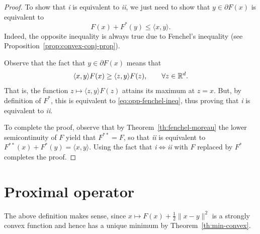 \documentclass{report}
\begin{document}
\begin{proof}
	To show that \emph{i} is equivalent to \emph{ii}, we just need to show that $y\in \partial F(x)$ is equivalent to 
	\begin{equation}
		\label{eq:opp-fenchel-ineq}
		F(x)+F^*(y) \le \langle  x,y\rangle.
	\end{equation}
	Indeed, the opposite inequality is always true due to Fenchel's inequality (see Proposition~\ref{prop:convex-conj-prop}).

	Observe that the fact that $y\in\partial F(x)$ means that
	\begin{equation}
		\langle x,y\rangle F(x)
		\ge \langle z,y\rangle F(z), \qquad \forall z\in \mathbb{R}^d.
	\end{equation}
	That is, the function $z\mapsto \langle z,y\rangle F(z)$ attains its maximum at $z=x$. But, by definition of $F^*$, this is equivalent to \eqref{eq:opp-fenchel-ineq}, thus proving that \emph{i} is equivalent to \emph{ii}.

	To complete the proof, observe that by Theorem~\ref{th:fenchel-moreau} the lower semicontinuity of $F$ yield that $F^{**}=F$, so that \emph{ii} is equivalent to $F^{**}(x)+F^*(y)=\langle x,y\rangle$. Using the fact that \emph{i}$\iff$\emph{ii} with $F$ replaced by $F^*$ completes the proof.
\end{proof}

\section{Proximal operator}
\label{sec:proximal}


The above definition makes sense, since $x\mapsto F(x) + \frac12 \|x-y\|^2$ is a strongly convex function and hence has a unique minimum by Theorem~\ref{th:min-convex}.

\end{document}
